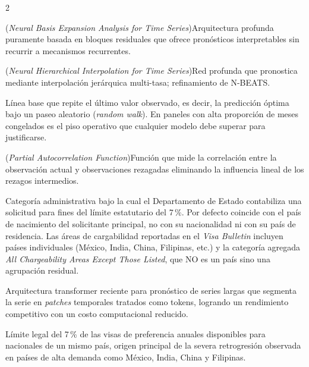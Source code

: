 \documentclass[12pt,letterpaper]{report}
\begin{document}
\begin{multicols}{2}
\begin{description}[leftmargin=0pt, labelindent=0pt, itemindent=0pt,
                    labelsep=0.4em, font=\bfseries\scriptsize,
                    itemsep=2pt, parsep=0pt, topsep=0pt]
    \item[N-BEATS] (\textit{Neural Basis Expansion Analysis for Time Series})\hspace{0.3em}Arquitectura profunda puramente basada en bloques residuales que ofrece pronósticos interpretables sin recurrir a mecanismos recurrentes.

    \item[N-HiTS] (\textit{Neural Hierarchical Interpolation for Time Series})\hspace{0.3em}Red profunda que pronostica mediante interpolación jerárquica multi-tasa; refinamiento de N-BEATS.

    \item[Naïve-1 (paseo aleatorio)] Línea base que repite el último valor observado, es decir, la predicción óptima bajo un paseo aleatorio (\textit{random walk}). En paneles con alta proporción de meses congelados es el piso operativo que cualquier modelo debe superar para justificarse.
    \item[PACF] (\textit{Partial Autocorrelation Function})\hspace{0.3em}Función que mide la correlación entre la observación actual y observaciones rezagadas eliminando la influencia lineal de los rezagos intermedios.

    \item[País de cargabilidad (\textit{chargeability area})] Categoría administrativa bajo la cual el Departamento de Estado contabiliza una solicitud para fines del límite estatutario del 7\,\%. Por defecto coincide con el país de nacimiento del solicitante principal, no con su nacionalidad ni con su país de residencia. Las áreas de cargabilidad reportadas en el \textit{Visa Bulletin} incluyen países individuales (México, India, China, Filipinas, etc.) y la categoría agregada \textit{All Chargeability Areas Except Those Listed}, que NO es un país sino una agrupación residual.

    \item[PatchTST] Arquitectura transformer reciente para pronóstico de series largas que segmenta la serie en \textit{patches} temporales tratados como tokens, logrando un rendimiento competitivo con un costo computacional reducido.

    \item[Per-country limit] Límite legal del 7\,\% de las visas de preferencia anuales disponibles para nacionales de un mismo país, origen principal de la severa retrogresión observada en países de alta demanda como México, India, China y Filipinas.


\end{description}
\end{multicols}
\end{document}
